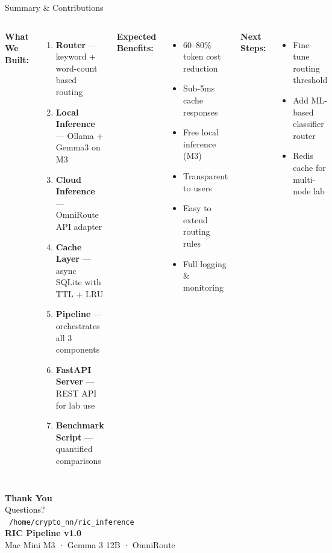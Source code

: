 \documentclass[aspectratio=169]{beamer}
\begin{document}
\begin{frame}{Summary \& Contributions}
\begin{columns}
\textbf{What We Built:}
\begin{enumerate}
  \item \textbf{Router} — keyword + word-count based routing
  \item \textbf{Local Inference} — Ollama + Gemma3 on M3
  \item \textbf{Cloud Inference} — OmniRoute API adapter
  \item \textbf{Cache Layer} — async SQLite with TTL + LRU
  \item \textbf{Pipeline} — orchestrates all 3 components
  \item \textbf{FastAPI Server} — REST API for lab use
  \item \textbf{Benchmark Script} — quantified comparisons
\end{enumerate}
\textbf{Expected Benefits:}
\begin{itemize}
  \item[\color{localgreen}$\checkmark$] 60--80\% token cost reduction
  \item[\color{localgreen}$\checkmark$] Sub-5ms cache responses
  \item[\color{localgreen}$\checkmark$] Free local inference (M3)
  \item[\color{localgreen}$\checkmark$] Transparent to users
  \item[\color{localgreen}$\checkmark$] Easy to extend routing rules
  \item[\color{localgreen}$\checkmark$] Full logging \& monitoring
\end{itemize}
\vspace{0.3cm}
\textbf{Next Steps:}
\begin{itemize}
  \item Fine-tune routing threshold
  \item Add ML-based classifier router
  \item Redis cache for multi-node lab
\end{itemize}
\end{columns}
\end{frame}

\begin{frame}[plain]
\begin{center}
{\Huge \textbf{Thank You}}\\[1cm]
{\Large Questions?}\\[1cm]
\faGithub\ \texttt{/home/crypto\_nn/ric\_inference}\\[0.5cm]
\textbf{RIC Pipeline v1.0}\\
Mac Mini M3 · Gemma 3 12B · OmniRoute
\end{center}
\end{frame}
\end{document}
